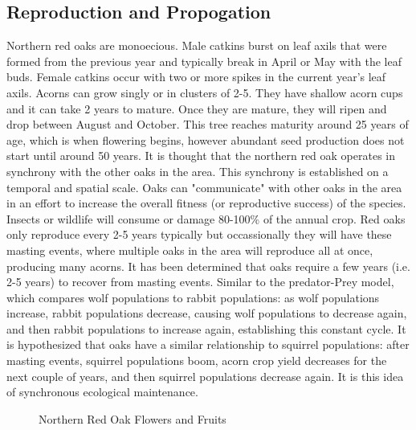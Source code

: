 \documentclass{article}\usepackage[]{graphicx}\usepackage[]{color}
\begin{document}
\subsection*{Reproduction and Propogation}
Northern red oaks are monoecious. Male catkins burst on leaf axils that were formed from the previous year and typically break in April or May with the leaf buds. Female catkins occur with two or more spikes in the current year's leaf axils. Acorns can grow singly or in clusters of 2-5. They have shallow acorn cups and it can take 2 years to mature. Once they are mature, they will ripen and drop between August and October. This tree reaches maturity around 25 years of age, which is when flowering begins, however abundant seed production does not start until around 50 years. It is thought that the northern red oak operates in synchrony with the other oaks in the area. This synchrony is established on a temporal and spatial scale. Oaks can "communicate" with other oaks in the area in an effort to increase the overall fitness (or reproductive success) of the species. Insects or wildlife will consume or damage 80-100\% of the annual crop. Red oaks only reproduce every 2-5 years typically but occassionally they will have these masting events, where multiple oaks in the area will reproduce all at once, producing many acorns. It has been determined that oaks require a few years (i.e. 2-5 years) to recover from masting events. Similar to the predator-Prey model, which compares wolf populations to rabbit populations: as wolf populations increase, rabbit populations decrease, causing wolf populations to decrease again, and then rabbit populations to increase again, establishing this constant cycle. It is hypothesized that oaks have a similar relationship to squirrel populations: after masting events, squirrel populations boom, acorn crop yield decreases for the next couple of years, and then squirrel populations decrease again. It is this idea of synchronous ecological maintenance.
\begin{figure}[ht]%
    \centering
    \qquad
    \caption{Northern Red Oak Flowers and Fruits}%
    \label{fig:fruit}%
\end{figure}
\newpage
\end{document}

